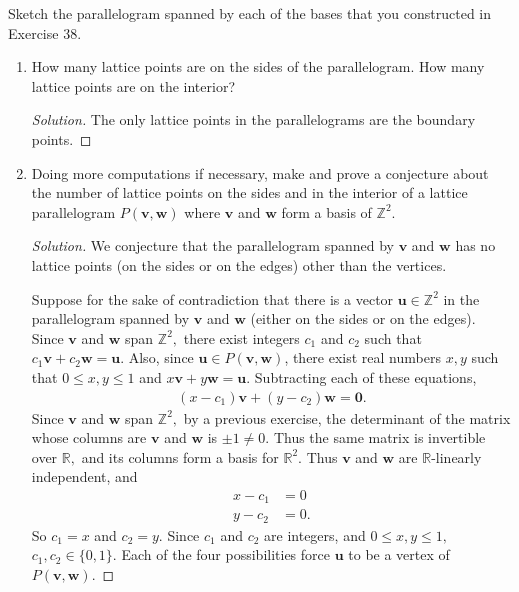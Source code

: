 \documentclass[12pt]{article}
\newcommand{\Z}{\mathbb{Z}}
\newcommand{\R}{\mathbb{R}}
\newenvironment{exercise}[2][Exercise]{\begin{trivlist}
        \item[\hskip \labelsep {\bfseries #1}\hskip \labelsep {\bfseries #2.}]}{\end{trivlist}}
\newenvironment{solution}
        {\begin{proof}[Solution]}
                    {\end{proof}}
\begin{document}
\begin{exercise}{40}
    Sketch the parallelogram spanned by each of the bases that you constructed in Exercise 38.
    \begin{enumerate}[label=(\alph*)]
        \item How many lattice points are on the sides of the parallelogram. How many lattice points are on the interior?
            \begin{solution}
                The only lattice points in the parallelograms are the boundary points.
            \end{solution}
        \item Doing more computations if necessary, make and prove a conjecture about the number of lattice points on the sides and in the interior of a lattice parallelogram \( P(\mathbf{v,w}) \) where \( \mathbf{v} \) and \( \mathbf{w} \) form a basis of \( \Z^{2}. \)
            \begin{solution}
                We conjecture that the parallelogram spanned by \( \mathbf{v} \) and \( \mathbf{w} \) has no lattice points (on the sides or on the edges) other than the vertices.

                Suppose for the sake of contradiction that there is a vector \( \mathbf{u} \in \Z^{2}  \) in the parallelogram spanned by \( \mathbf{v} \) and \( \mathbf{w} \) (either on the sides or on the edges). Since \( \mathbf{v} \) and \( \mathbf{w} \) span \( \Z^{2} , \) there exist integers \(c_{1} \) and \( c_{2} \) such that \( c_{1} \mathbf{v} + c_{2} \mathbf{w} = \mathbf{u}  \). Also, since \( \mathbf{u} \in P ( \mathbf{v} , \mathbf{w}) \), there exist real numbers \( x, y \) such that \( 0 \leq x,y \leq 1 \) and \( x \mathbf{v} + y \mathbf{w} = \mathbf{u} . \) Subtracting each of these equations,
                \begin{align*}
                    (x - c_{1}) \mathbf{v} + (y - c_{2}) \mathbf{w} = \mathbf{0} .
                \end{align*}
                Since \( \mathbf{v} \) and \( \mathbf{w} \) span \( \Z^{2} , \) by a previous exercise, the determinant of the matrix whose columns are \( \mathbf{v} \) and \( \mathbf{w} \) is \( \pm 1 \neq 0. \) Thus the same matrix is invertible over \( \R, \) and its columns form a basis for \( \R^{2} . \) Thus \( \mathbf{v} \) and \( \mathbf{w} \) are \( \R \)-linearly independent, and
                \begin{align*}
                    x - c_{1} &= 0\\
                    y-c_{2} &= 0.
                \end{align*}
                So \( c_{1} = x \) and \( c_{2} = y. \) Since \( c_{1} \) and \( c_{2} \) are integers, and \( 0 \leq x,y \leq 1, \) \( c_{1}, c_{2} \in \{0,1 \} . \) Each of the four possibilities force \( \mathbf{u} \) to be a vertex of \( P(\mathbf{v} , \mathbf{w}) . \)
            \end{solution}
    \end{enumerate}
\end{exercise}
\end{document}
